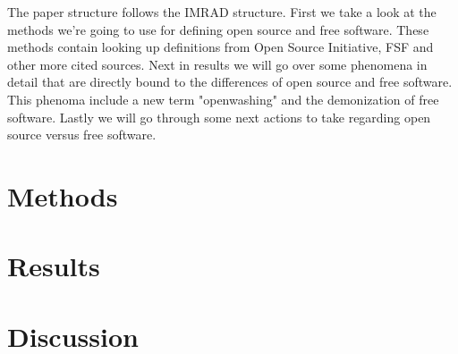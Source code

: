 \documentclass[conference]{IEEEtran}
\begin{document}
The paper structure follows the IMRAD structure. First we take a look at the methods we're going to use for defining open source and free software. These methods contain looking up definitions from Open Source Initiative, FSF and other more cited sources. Next in results we will go over some phenomena in detail that are directly bound to the differences of open source and free software. This phenoma include a new term "openwashing" and the demonization of free software. Lastly we will go through some next actions to take regarding open source versus free software.

\section{Methods}

\section{Results}

\section{Discussion}


{}
\end{document}
